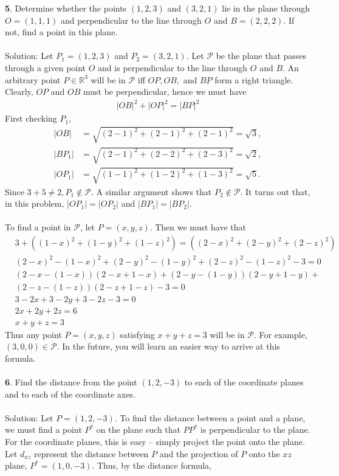 \documentclass[12pt]{amsbook}
\begin{document}
\noindent
{\small {\bf 5}}. Determine whether the points $(1,2,3)$ and
$(3,2,1)$ lie in the plane through $O=(1,1,1)$ and perpendicular 
to the line through $O$ and $B=(2,2,2)$. If not, find a point 
in this plane.\\
\\
{\sc Solution}:
Let $P_1=(1,2,3)$ and $P_2=(3,2,1)$. Let $\mathcal{P}$ be the plane that passes through a given point $O$ and is perpendicular to the line through $O$ and $B$.  An arbitrary point $P \in \mathbb{R}^3$ will be in $\mathcal{P}$ iff $OP,OB,$ and $BP$ form a right triangle. Clearly, $OP$ and $OB$ must be perpendicular, hence we must have
\begin{align*}
|OB|^2+|OP|^2=|BP|^2
\end{align*}
First checking $P_1$,
\begin{align*}
|OB|&=\sqrt{(2-1)^2+(2-1)^2+(2-1)^2}=\sqrt{3},\\
|BP_1|&=\sqrt{(2-1)^2+(2-2)^2+(2-3)^2}=\sqrt{2},\\
|OP_1|&=\sqrt{(1-1)^2+(1-2)^2+(1-3)^2}=\sqrt{5}.
\end{align*}
Since $3+5 \neq 2, P_1 \notin \mathcal{P}$. A similar argument shows that $P_2 \notin \mathcal{P}$. It turns out that, in this problem, $|OP_1|=|OP_2|$ and $|BP_1|=|BP_2|$. 
\\
\\
To find a point in $\mathcal{P}$, let $P=(x,y,z)$. Then we must have that
\begin{align*}
&3+((1-x)^2+(1-y)^2+(1-z)^2)=((2-x)^2+(2-y)^2+(2-z)^2)\\
&(2-x)^2-(1-x)^2+(2-y)^2-(1-y)^2+(2-z)^2-(1-z)^2-3=0 \\
&(2-x-(1-x))(2-x+1-x)+(2-y-(1-y))(2-y+1-y)+
\\
&(2-z-(1-z))(2-z+1-z)-3=0\\
&3-2x+3-2y+3-2z-3=0\\
&2x+2y+2z=6\\
&x+y+z=3
\end{align*}
Thus any point $P=(x,y,z)$ satisfying $x+y+z=3$ will be in $\mathcal{P}$. For example, $(3,0,0) \in \mathcal{P}$. In the future, you will learn an easier way to arrive at this formula. 
\\
\\
{\small\bf 6}. Find the distance from the point $(1,2,-3)$
to each of the coordinate planes and to each of the 
coordinate axes.\\
\\
{\sc Solution}: Let $P=(1,2,-3)$. To find the distance between a point and a plane, we must find a point $P^*$ on the plane such that $PP^*$ is perpendicular to the plane. For the coordinate planes, this is easy -- simply project the point onto the plane. Let $d_{xz}$ represent the distance between $P$ and the projection of $P$ onto the $xz$ plane, $P^*=(1,0,-3)$. Thus, by the distance formula,
\end{document}
